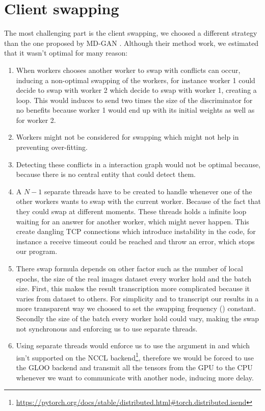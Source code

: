 \section{Client swapping}
The most challenging part is the client swapping, we choosed a different strategy than the one proposed by MD-GAN \cite{mdgan}. Although their method work, we estimated that it wasn't optimal for many reason:
\begin{enumerate}
    \item When workers chooses another worker to swap with conflicts can occur, inducing a non-optimal swapping of the workers, for instance worker 1 could decide to swap with worker 2 which decide to swap with worker 1, creating a loop. This would induces to send two times the size of the discriminator for no benefits because worker 1 would end up with its initial weights as well as for worker 2.
    \item Workers might not be considered for swapping which might not help in preventing over-fitting.
    \item Detecting these conflicts in a interaction graph would not be optimal because, because there is no central entity that could detect them.
    \item A $N-1$ separate threads have to be created to handle whenever one of the other workers wants to swap with the current worker. Because of the fact that they could swap at different moments. These threads holds a infinite loop waiting for an answer for another worker, which might never happen. This create dangling TCP connections which introduce instability in the code, for instance a receive timeout could be reached and throw an error, which stops our program.
    \item There swap formula depends on other factor such as the number of local epochs, the size of the real images dataset every worker hold and the batch size. First, this makes the result transcription more complicated because it varies from dataset to others. For simplicity and to transcript our results in a more transparent way we choosed to set the swapping frequency () constant. Secondly the size of the batch every worker hold could vary, making the swap not synchronous and enforcing us to use separate threads.
    \item Using separate threads would enforce us to use the  argument in  and  which isn't supported on the NCCL backend\footnote{\url{https://pytorch.org/docs/stable/distributed.html\#torch.distributed.isend}}, therefore we would be forced to use the GLOO backend and transmit all the tensors from the GPU to the CPU whenever we want to communicate with another node, inducing more delay.
\end{enumerate}

